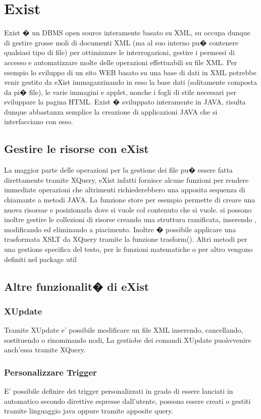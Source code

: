 \documentclass[11pt,titlepage,a4paper,twoside,openany]{book}
\begin{document}
\chapter{Exist}
Exist � un DBMS open source interamente basato su XML, su occupa dunque di gestire grosse moli di documenti XML (ma al suo interno pu� contenere qualsiasi tipo di file) per ottimizzare le interrogazioni, gestire i permessi di accesso e automatizzare molte delle operazioni effettuabili su file XML.
Per esempio lo sviluppo di un sito WEB basato su una base di dati in XML potrebbe venir gestito da eXist immagazzinando in esso la base dati (solitamente composta da pi� file), le varie immagini e applet, nonche i fogli di stile necessari per sviluppare la pagina HTML.
Exist � sviluppato interamente in JAVA, risulta dunque abbastanza semplice la creazione di applicazioni JAVA che si interfacciano con esso.

\section{Gestire le risorse con eXist}
La maggior parte delle operazioni per la gestione dei file pu� essere fatta direttamente tramite XQuery, eXist infatti fornisce alcune funzioni per rendere immediate operazioni che altrimenti richiederebbero una apposita sequenza di chiamante a metodi JAVA.
La funzione store per esempio permette di creare una nuova risorsae e posizionarla dove si vuole col contenuto che si vuole. si possono inoltre gestire le collezioni di risorse creando una struttura ramificata, inserendo , modificando ed eliminando a piacimento.
Inoltre � possibile applicare una trasformata XSLT da XQuery tramite la funzione trasform().
Altri metodi per una gestione specifica del testo, per le funzioni matematiche o per altro vengono definiti nel package util

\section{Altre funzionalit� di eXist}
\subsection{XUpdate}
Tramite XUpdate e' possibile modificare un file XML inserendo, cancellando, sostituendo o rinominando nodi, La gestiobe dei comandi XUpdate puo\` avvenire anch'essa tramite XQuery.
\subsection{Personalizzare Trigger}
E' possibile definire dei trigger personalizzati in grado di essere lanciati in automatico secondo direttive espresse dall'utente, possono essere creati o gestiti tramite linguaggio java oppure tramite apposite query.
\end{document}
